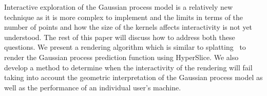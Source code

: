 Interactive 
exploration of the Gaussian process model is a 
relatively new technique as it is more complex to implement and the limits
in terms of the number of points and how the size of the kernels affects 
interactivity is not yet understood.  
The rest of this paper will discuss how to address both these questions.
We present a rendering algorithm which is similar to 
splatting~\cite{Mueller:1998}
to render the Gaussian
process prediction function using HyperSlice.
We also develop a method to determine when
the interactivity of the rendering will fail taking into account the geometric 
interpretation of the Gaussian process model as well as the performance
of an individual user's machine.

